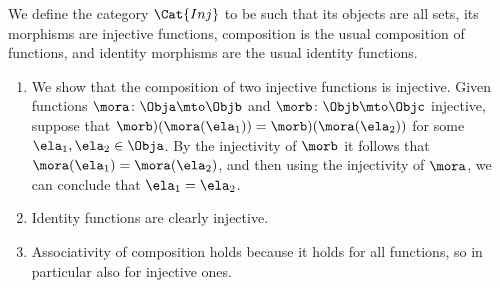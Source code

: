 \begin{solution}
We define the category $\Cat{Inj}$ to be such that its objects are all sets, its morphisms are injective functions, composition is the usual composition of functions, and identity morphisms are the usual identity functions. 
\begin{enumerate}
\item We show that the composition of two injective functions is injective. Given functions $\mora \colon \Obja \mto  \Objb$ and $\morb \colon \Objb \mto \Objc$ injective, suppose that $ \morb)(\mora (\ela_1)) = \morb)(\mora (\ela_2))$ for some $\ela_1, \ela_2 \in \Obja$. By the injectivity of $\morb$ it follows that $\mora (\ela_1) = \mora (\ela_2)$, and then using the injectivity of $\mora$, we can conclude that $\ela_1 = \ela_2$. 
\item Identity functions are clearly injective. 
\item Associativity of composition holds because it holds for all functions, so in particular also for injective ones. 
\end{enumerate}
\end{solution}

